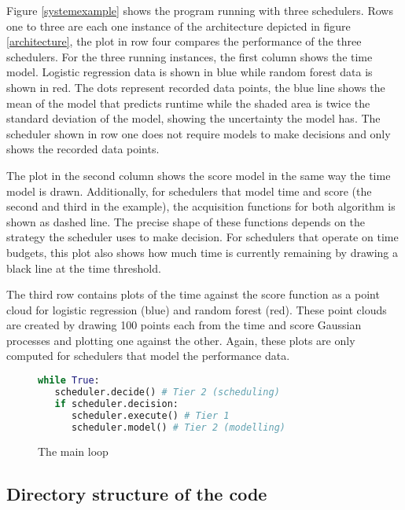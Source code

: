 \documentclass[a4paper,12pt,twoside,openright]{report}
\begin{document}
Figure \ref{systemexample} shows the program running with three schedulers. Rows one to three are each one instance of the architecture depicted in figure \ref{architecture}, the plot in row four compares the performance of the three schedulers. For the three running instances, the first column shows the time model. Logistic regression data is shown in blue while random forest data is shown in red. The dots represent recorded data points, the blue line shows the mean of the model that predicts runtime while the shaded area is twice the standard deviation of the model, showing the uncertainty the model has. The scheduler shown in row one does not require models to make decisions and only shows the recorded data points.

The plot in the second column shows the score model in the same way the time model is drawn. Additionally, for schedulers that model time and score (the second and third in the example), the acquisition functions for both algorithm is shown as dashed line. The precise shape of these functions depends on the strategy the scheduler uses to make decision. For schedulers that operate on time budgets, this plot also shows how much time is currently remaining by drawing a black line at the time threshold.

The third row contains plots of the time against the score function as a point cloud for logistic regression (blue) and random forest (red). These point clouds are created by drawing 100 points each from the time and score Gaussian processes and plotting one against the other. Again, these plots are only computed for schedulers that model the performance data.





\begin{figure}[ht]
\begin{lstlisting}[language=Python]
while True:
   scheduler.decide() # Tier 2 (scheduling)
   if scheduler.decision:
      scheduler.execute() # Tier 1
      scheduler.model() # Tier 2 (modelling)
\end{lstlisting}
\caption{The main loop}
\label{mainloop}
\end{figure}


\subsection{Directory structure of the code}
\end{document}
